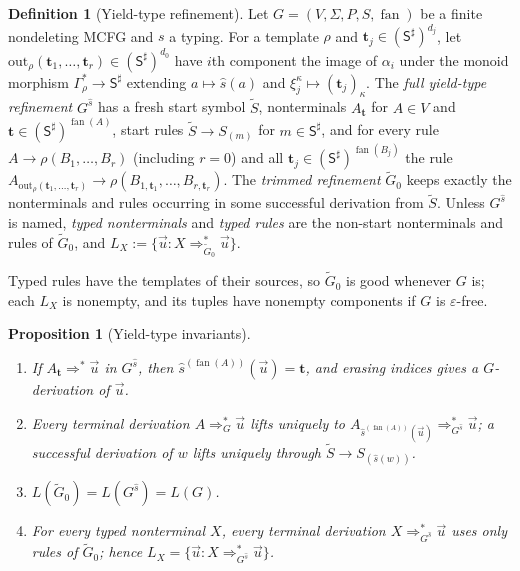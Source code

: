 \documentclass[11pt]{article}
\numberwithin{equation}{section}
\theoremstyle{plain}
\newtheorem{proposition}[theorem]{Proposition}
\theoremstyle{definition}
\newtheorem{definition}[theorem]{Definition}
\theoremstyle{remark}
\newcommand{\out}{\mathrm{out}}
\newcommand{\tuple}[1]{\vec{#1}}
\newcommand{\eps}{\varepsilon}
\newcommand{\fan}{\operatorname{fan}}
\theoremstyle{plain}
\begin{document}
\begin{definition}[Yield-type refinement]
\label{def:output-refinement}
Let $G=(V,\Sigma,P,S,\fan)$ be a finite nondeleting MCFG and $s$ a typing.
For a template $\rho$ and $\mathbf t_j\in(\mathsf S^\sharp)^{d_j}$, let
$\out_\rho(\mathbf t_1,\ldots,\mathbf t_r)\in(\mathsf S^\sharp)^{d_0}$ have
$i$th component the image of $\alpha_i$ under the monoid morphism
$\Gamma_\rho^*\to\mathsf S^\sharp$ extending $a\mapsto\widehat{s}(a)$ and
$\xi_j^\kappa\mapsto(\mathbf t_j)_\kappa$.  The \emph{full yield-type
refinement} $G^{\widehat{s}}$ has a fresh start symbol $\widetilde S$,
nonterminals $A_{\mathbf t}$ for $A\in V$ and
$\mathbf t\in(\mathsf S^\sharp)^{\fan(A)}$, start rules
$\widetilde S\to S_{(m)}$ for $m\in\mathsf S^\sharp$, and for every rule
$A\to\rho(B_1,\ldots,B_r)$ (including $r=0$) and all
$\mathbf t_j\in(\mathsf S^\sharp)^{\fan(B_j)}$ the rule
$A_{\out_\rho(\mathbf t_1,\ldots,\mathbf t_r)}\to
\rho(B_{1,\mathbf t_1},\ldots,B_{r,\mathbf t_r})$.  The \emph{trimmed
refinement} $\widetilde G_0$ keeps exactly the nonterminals and rules occurring
in some successful derivation from $\widetilde S$.  Unless $G^{\widehat{s}}$ is
named, \emph{typed nonterminals} and \emph{typed rules} are the non-start
nonterminals and rules of $\widetilde G_0$, and
$L_X:=\{\tuple u:X\Rightarrow_{\widetilde G_0}^*\tuple u\}$.
\end{definition}

Typed rules have the templates of their sources, so $\widetilde G_0$ is good
whenever $G$ is; each $L_X$ is nonempty, and its tuples have nonempty
components if $G$ is $\eps$-free.

\begin{proposition}[Yield-type invariants]
\label{prop:output-invariants}
\begin{enumerate}[label=(\roman*),leftmargin=*]
\item If $A_{\mathbf t}\Rightarrow^*\tuple u$ in $G^{\widehat{s}}$, then
$\widehat{s}^{(\fan(A))}(\tuple u)=\mathbf t$, and erasing indices gives a
$G$-derivation of $\tuple u$.
\item Every terminal derivation $A\Rightarrow_G^*\tuple u$ lifts uniquely to
$A_{\widehat{s}^{(\fan(A))}(\tuple u)}\Rightarrow_{G^{\widehat{s}}}^*\tuple u$; a successful
derivation of $w$ lifts uniquely through $\widetilde S\to S_{(\widehat{s}(w))}$.
\item $L(\widetilde G_0)=L(G^{\widehat{s}})=L(G)$.
\item For every typed nonterminal $X$, every terminal derivation
$X\Rightarrow^*_{G^{\widehat s}}\tuple u$ uses only rules of $\widetilde G_0$; hence
$L_X=\{\tuple u:X\Rightarrow^*_{G^{\widehat s}}\tuple u\}$.
\end{enumerate}
\end{proposition}
\end{document}
